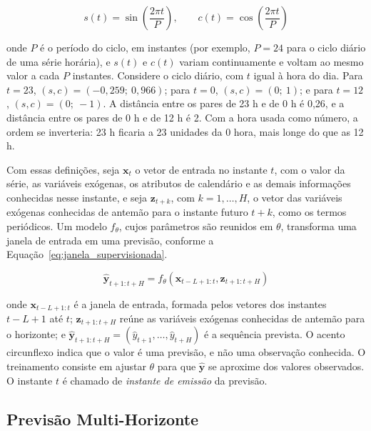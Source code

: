 \begin{equation}
    s(t)=\sin\left(\frac{2\pi t}{P}\right),
    \qquad
    c(t)=\cos\left(\frac{2\pi t}{P}\right)
    \label{eq:termos_periodicos}
\end{equation}

\noindent onde \(P\) é o período do ciclo, em instantes (por exemplo, \(P=24\) para o ciclo diário de uma série horária), e \(s(t)\) e \(c(t)\) variam continuamente e voltam ao mesmo valor a cada \(P\) instantes. Considere o ciclo diário, com \(t\) igual à hora do dia. Para \(t=23\), \((s,c)=(-0{,}259;\ 0{,}966)\); para \(t=0\), \((s,c)=(0;\ 1)\); e para \(t=12\), \((s,c)=(0;\ -1)\). A distância entre os pares de 23 h e de 0 h é 0,26, e a distância entre os pares de 0 h e de 12 h é 2. Com a hora usada como número, a ordem se inverteria: 23 h ficaria a 23 unidades da 0 hora, mais longe do que as 12 h.

Com essas definições, seja \(\mathbf{x}_t\) o vetor de entrada no instante \(t\), com o valor da série, as variáveis exógenas, os atributos de calendário e as demais informações conhecidas nesse instante, e seja \(\mathbf{z}_{t+k}\), com \(k=1,\ldots,H\), o vetor das variáveis exógenas conhecidas de antemão para o instante futuro \(t+k\), como os termos periódicos. Um modelo \(f_{\theta}\), cujos parâmetros são reunidos em \(\theta\), transforma uma janela de entrada em uma previsão, conforme a Equação~\ref{eq:janela_supervisionada}.

\begin{equation}
    \hat{\mathbf{y}}_{t+1:t+H}
    =
    f_{\theta}\left(
        \mathbf{x}_{t-L+1:t},
        \mathbf{z}_{t+1:t+H}
    \right)
    \label{eq:janela_supervisionada}
\end{equation}

\noindent onde \(\mathbf{x}_{t-L+1:t}\) é a janela de entrada, formada pelos vetores dos instantes \(t-L+1\) até \(t\); \(\mathbf{z}_{t+1:t+H}\) reúne as variáveis exógenas conhecidas de antemão para o horizonte; e \(\hat{\mathbf{y}}_{t+1:t+H}=(\hat{y}_{t+1},\ldots,\hat{y}_{t+H})\) é a sequência prevista. O acento circunflexo indica que o valor é uma previsão, e não uma observação conhecida. O treinamento consiste em ajustar \(\theta\) para que \(\hat{\mathbf{y}}\) se aproxime dos valores observados. O instante \(t\) é chamado de \emph{instante de emissão} da previsão.

\subsection{Previsão Multi-Horizonte}
\label{sec:previsao_multi_horizonte}

